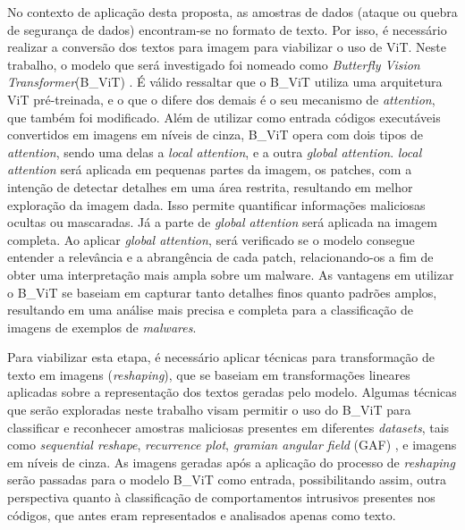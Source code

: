 No contexto de aplicação desta proposta, as amostras de dados (ataque ou quebra de segurança de dados) encontram-se no formato de texto. Por isso, é necessário realizar a conversão dos textos para imagem para viabilizar o uso de ViT. Neste trabalho, o modelo que será investigado foi nomeado como \textit{Butterfly Vision Transformer}(B\_ViT) \cite{belal2023global}. É válido ressaltar que o B\_ViT utiliza uma arquitetura ViT pré-treinada, e o que o difere dos demais é o seu mecanismo de \textit{attention}, que também foi modificado. Além de utilizar como entrada códigos executáveis convertidos em imagens em níveis de cinza, B\_ViT opera com dois tipos de \textit{attention}, sendo uma delas a \textit{local attention}, e a outra \textit{global attention}. \textit{local attention} será aplicada em pequenas partes da imagem, os patches, com a intenção de detectar detalhes em uma área restrita, resultando em melhor exploração da imagem dada. Isso permite quantificar informações maliciosas ocultas ou mascaradas. Já a parte de \textit{global attention} será aplicada na imagem completa. Ao aplicar \textit{global attention}, será verificado se o modelo consegue entender a relevância e a abrangência de cada patch, relacionando-os a fim de obter uma interpretação mais ampla sobre um malware. As vantagens em utilizar o B\_ViT se baseiam em capturar tanto detalhes finos quanto padrões amplos, resultando em uma análise mais precisa e completa para a classificação de imagens de exemplos de \textit{malwares}.

Para viabilizar esta etapa, é necessário aplicar técnicas para transformação de texto em imagens (\textit{reshaping}), que se baseiam em transformações lineares aplicadas sobre a representação dos textos geradas pelo modelo. Algumas técnicas que serão exploradas neste trabalho visam permitir o uso do B\_ViT para classificar e reconhecer amostras maliciosas presentes em diferentes \textit{datasets}, tais como \textit{sequential reshape}, \textit{recurrence plot}, \textit{gramian angular field} (GAF) \cite{terzi2022gramian}, e imagens em níveis de cinza. As imagens geradas após a aplicação do processo de \textit{reshaping} serão passadas para o modelo B\_ViT como entrada, possibilitando assim, outra perspectiva quanto à classificação de comportamentos intrusivos presentes nos códigos, que antes eram representados e analisados apenas como texto.

